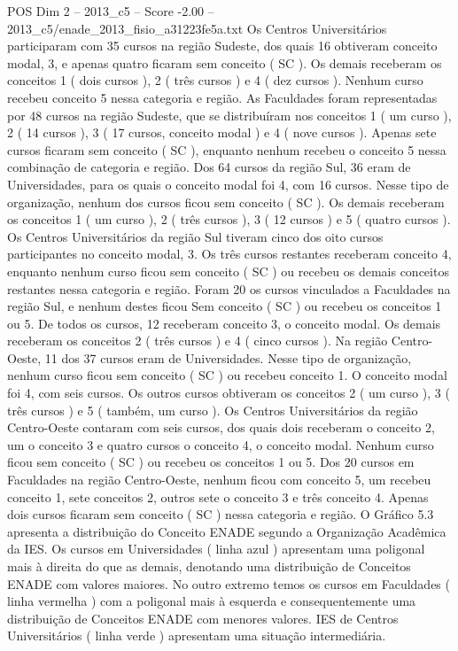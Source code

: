 \begin{textsample}{POS Dim 2 – 2013\_c5 – Score -2.00 – 2013\_c5/enade\_2013\_fisio\_a31223fe5a.txt}
Os Centros Universitários participaram com 35 cursos na região Sudeste, dos quais 16 obtiveram conceito modal, 3, e apenas quatro ficaram sem conceito ( SC ).
Os demais receberam os conceitos 1 ( dois cursos ), 2 ( três cursos ) e 4 ( dez cursos ).
Nenhum curso recebeu conceito 5 nessa categoria e região.
As Faculdades foram representadas por 48 cursos na região Sudeste, que se distribuíram nos conceitos 1 ( um curso ), 2 ( 14 cursos ), 3 ( 17 cursos, conceito modal ) e 4 ( nove cursos ).
Apenas sete cursos ficaram sem conceito ( SC ), enquanto nenhum recebeu o conceito 5 nessa combinação de categoria e região.
Dos 64 cursos da região Sul, 36 eram de Universidades, para os quais o conceito modal foi 4, com 16 cursos.
Nesse tipo de organização, nenhum dos cursos ficou sem conceito ( SC ).
Os demais receberam os conceitos 1 ( um curso ), 2 ( três cursos ), 3 ( 12 cursos ) e 5 ( quatro cursos ).
Os Centros Universitários da região Sul tiveram cinco dos oito cursos participantes no conceito modal, 3.
Os três cursos restantes receberam conceito 4, enquanto nenhum curso ficou sem conceito ( SC ) ou recebeu os demais conceitos restantes nessa categoria e região.
Foram 20 os cursos vinculados a Faculdades na região Sul, e nenhum destes ficou Sem conceito ( SC ) ou recebeu os conceitos 1 ou 5.
De todos os cursos, 12 receberam conceito 3, o conceito modal.
Os demais receberam os conceitos 2 ( três cursos ) e 4 ( cinco cursos ).
Na região Centro-Oeste, 11 dos 37 cursos eram de Universidades.
Nesse tipo de organização, nenhum curso ficou sem conceito ( SC ) ou recebeu conceito 1.
O conceito modal foi 4, com seis cursos.
Os outros cursos obtiveram os conceitos 2 ( um curso ), 3 ( três cursos ) e 5 ( também, um curso ).
Os Centros Universitários da região Centro-Oeste contaram com seis cursos, dos quais dois receberam o conceito 2, um o conceito 3 e quatro cursos o conceito 4, o conceito modal.
Nenhum curso ficou sem conceito ( SC ) ou recebeu os conceitos 1 ou 5.
Dos 20 cursos em Faculdades na região Centro-Oeste, nenhum ficou com conceito 5, um recebeu conceito 1, sete conceitos 2, outros sete o conceito 3 e três conceito 4.
Apenas dois cursos ficaram sem conceito ( SC ) nessa categoria e região.
O Gráfico 5.3 apresenta a distribuição do Conceito ENADE segundo a Organização Acadêmica da IES.
Os cursos em Universidades ( linha azul ) apresentam uma poligonal mais à direita do que as demais, denotando uma distribuição de Conceitos ENADE com valores maiores.
No outro extremo temos os cursos em Faculdades ( linha vermelha ) com a poligonal mais à esquerda e consequentemente uma distribuição de Conceitos ENADE com menores valores.
IES de Centros Universitários ( linha verde ) apresentam uma situação intermediária.

\end{textsample}
